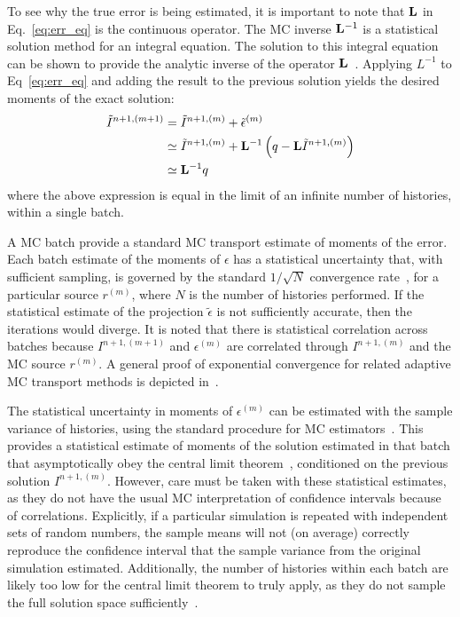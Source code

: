 To see why the true error is being estimated, it is important to note that 
$\mathbf{L}$ in Eq.~\eqref{eq:err_eq} is the continuous operator.  The MC inverse $\mathbf{L}^{-1}$ is
a statistical solution method for an integral equation.  The solution to this integral
equation can be shown to provide the analytic inverse of the operator $\mathbf{L}$~\cite{shultis_mc,cj_thesis}.  Applying $L^{-1}$ to Eq~\eqref{eq:err_eq} and adding the
result to the previous solution yields the desired moments of the exact solution:
\begin{align}
   \tilde I^{n+1,(m+1)} &= \tilde I^{n+1,(m)} + \tilde\epsilon^{(m)} \\
                  &\simeq  \tilde I^{n+1,(m)} + \mathbf{L}^{-1} \left(q - \mathbf{L} \tilde I^{n+1,(m)} \right) \\
                  &\simeq \mathbf{L}^{-1} q
\end{align}
where the above expression is equal in the limit of an infinite number of histories,
within a single batch.

A MC batch provide a standard MC transport estimate of moments of the error.  Each batch
estimate of the moments of $\epsilon$ has a statistical uncertainty that, with sufficient
sampling, is governed by the standard $1/\sqrt{N}$ convergence rate~\cite{shultis_mc}, for a
particular source $r^{(m)}$, where $N$ is the number of histories performed.  If the statistical estimate of the projection $\tilde\epsilon$ is not sufficiently
accurate, then the iterations would diverge. It is noted that there is statistical correlation across batches because
$I^{n+1,(m+1)}$ and $\epsilon^{(m)}$ are correlated through $I^{n+1,(m)}$ and the MC source $r^{(m)}$.  
A general proof of exponential
convergence for related adaptive MC transport methods is depicted in~\cite{spanier_mc}.  

The statistical uncertainty in moments of $\epsilon^{(m)}$ can be estimated with the
sample variance of histories, using the standard procedure for MC estimators~\cite{shultis_mc}.  This provides a statistical estimate of moments of the solution estimated in
that batch that asymptotically obey the central limit theorem~\cite{shultis_mc},
conditioned on the previous solution $I^{n+1,(m)}$.  However, care
must be taken with these statistical estimates, as they do not have the usual MC
interpretation of confidence intervals because of correlations.  Explicitly, if a
particular simulation is repeated with independent sets of random numbers, the
sample means will not (on average) correctly reproduce the confidence interval that the
sample variance from the original simulation estimated.  Additionally, the number of histories within each batch are likely
too low  for the central limit theorem to truly apply, as they  do not sample the full
solution space sufficiently~\cite{mcnp}.

